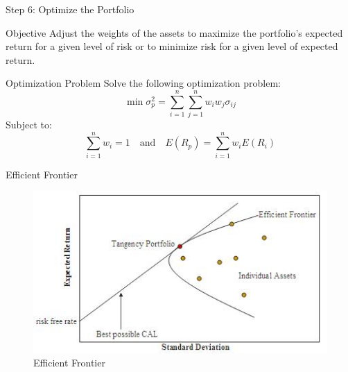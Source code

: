 \documentclass{beamer}
\begin{document}
\begin{frame}{Step 6: Optimize the Portfolio}
    \begin{block}{Objective}
        Adjust the weights of the assets to maximize the portfolio's expected return for a given level of risk or to minimize risk for a given level of expected return.
    \end{block}
    \begin{block}{Optimization Problem}
        Solve the following optimization problem:
        \begin{equation*}
            \min \sigma_p^2 = \sum_{i=1}^{n} \sum_{j=1}^{n} w_i w_j \sigma_{ij}
        \end{equation*}
        Subject to:
        \begin{equation*}
            \sum_{i=1}^{n} w_i = 1 \quad \text{and} \quad E(R_p) = \sum_{i=1}^{n} w_i E(R_i)
        \end{equation*}
    \end{block}
\end{frame}


\begin{frame}{Efficient Frontier}
    \begin{figure}[h]
        \centering
        \includegraphics[width=\textwidth]{efficient_frontier.png}
        \caption{Efficient Frontier}
    \end{figure}
\end{frame}
\end{document}
